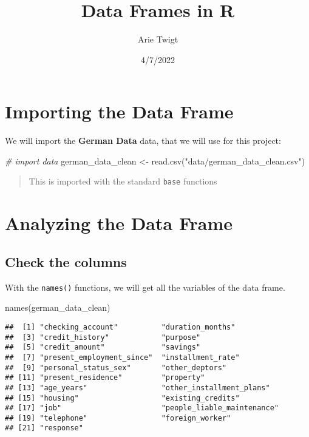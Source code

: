 \documentclass[
]{article}
\title{Data Frames in R}
\author{Arie Twigt}
\date{4/7/2022}
\newenvironment{Shaded}{\begin{snugshade}}{\end{snugshade}}
\newcommand{\CommentTok}[1]{\textcolor[rgb]{0.56,0.35,0.01}{\textit{#1}}}
\newcommand{\FunctionTok}[1]{\textcolor[rgb]{0.00,0.00,0.00}{#1}}
\newcommand{\NormalTok}[1]{#1}
\newcommand{\OtherTok}[1]{\textcolor[rgb]{0.56,0.35,0.01}{#1}}
\newcommand{\StringTok}[1]{\textcolor[rgb]{0.31,0.60,0.02}{#1}}
\begin{document}
\maketitle

\hypertarget{importing-the-data-frame}{%
\section{Importing the Data Frame}\label{importing-the-data-frame}}

We will import the \textbf{German Data} data, that we will use for this
project:

\begin{Shaded}
\begin{Highlighting}[]
\CommentTok{\# import data}
\NormalTok{german\_data\_clean }\OtherTok{\textless{}{-}} \FunctionTok{read.csv}\NormalTok{(}\StringTok{"data/german\_data\_clean.csv"}\NormalTok{)}
\end{Highlighting}
\end{Shaded}

\begin{quote}
This is imported with the standard \texttt{base} functions
\end{quote}

\hypertarget{analyzing-the-data-frame}{%
\section{Analyzing the Data Frame}\label{analyzing-the-data-frame}}

\hypertarget{check-the-columns}{%
\subsection{Check the columns}\label{check-the-columns}}

With the \texttt{names()} functions, we will get all the variables of
the data frame.

\begin{Shaded}
\begin{Highlighting}[]
\FunctionTok{names}\NormalTok{(german\_data\_clean)}
\end{Highlighting}
\end{Shaded}

\begin{verbatim}
##  [1] "checking_account"          "duration_months"          
##  [3] "credit_history"            "purpose"                  
##  [5] "credit_amount"             "savings"                  
##  [7] "present_employment_since"  "installment_rate"         
##  [9] "personal_status_sex"       "other_deptors"            
## [11] "present_residence"         "property"                 
## [13] "age_years"                 "other_installment_plans"  
## [15] "housing"                   "existing_credits"         
## [17] "job"                       "people_liable_maintenance"
## [19] "telephone"                 "foreign_worker"           
## [21] "response"
\end{verbatim}
\end{document}
